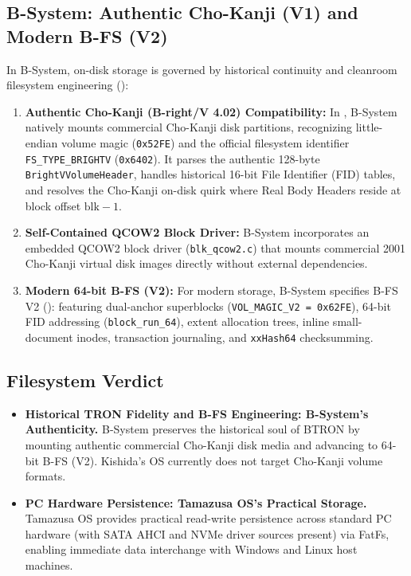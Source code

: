 \documentclass[10pt,journal,compsoc,twocolumn]{article}
\begin{document}
\subsection{B-System: Authentic Cho-Kanji (V1) and Modern B-FS (V2)}
In B-System, on-disk storage is governed by historical continuity and cleanroom filesystem engineering ():
\begin{enumerate}[leftmargin=*]
    \item \textbf{Authentic Cho-Kanji (B-right/V 4.02) Compatibility:} In , B-System natively mounts commercial Cho-Kanji disk partitions, recognizing little-endian volume magic (\texttt{0x52FE}) and the official filesystem identifier \texttt{FS\_TYPE\_BRIGHTV} (\texttt{0x6402}). It parses the authentic 128-byte \texttt{BrightVVolumeHeader}, handles historical 16-bit File Identifier (FID) tables, and resolves the Cho-Kanji on-disk quirk where Real Body Headers reside at block offset $\text{blk} - 1$.
    \item \textbf{Self-Contained QCOW2 Block Driver:} B-System incorporates an embedded QCOW2 block driver (\texttt{blk\_qcow2.c}) that mounts commercial 2001 Cho-Kanji virtual disk images directly without external dependencies.
    \item \textbf{Modern 64-bit B-FS (V2):} For modern storage, B-System specifies B-FS V2 (): featuring dual-anchor superblocks (\texttt{VOL\_MAGIC\_V2 = 0x62FE}), 64-bit FID addressing (\texttt{block\_run\_64}), extent allocation trees, inline small-document inodes, transaction journaling, and \texttt{xxHash64} checksumming.
\end{enumerate}

\subsection{Filesystem Verdict}
\begin{itemize}[leftmargin=*]
    \item \textbf{Historical TRON Fidelity and B-FS Engineering: B-System's Authenticity.} B-System preserves the historical soul of BTRON by mounting authentic commercial Cho-Kanji disk media and advancing to 64-bit B-FS (V2). Kishida's OS currently does not target Cho-Kanji volume formats.
    \item \textbf{PC Hardware Persistence: Tamazusa OS's Practical Storage.} Tamazusa OS provides practical read-write persistence across standard PC hardware (with SATA AHCI and NVMe driver sources present) via FatFs, enabling immediate data interchange with Windows and Linux host machines.
\end{itemize}
\end{document}
